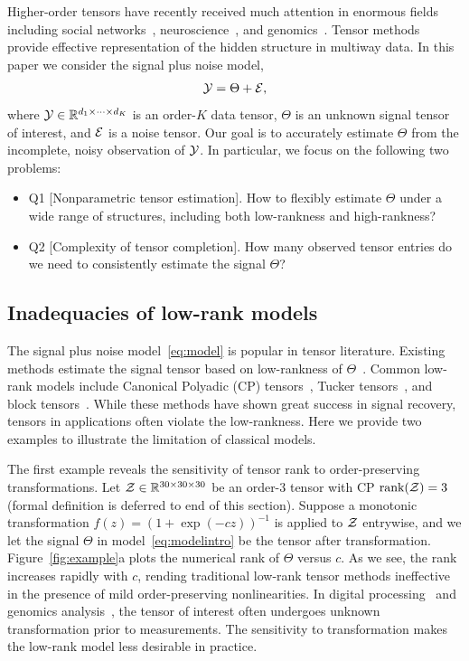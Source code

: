 \documentclass[useAMS,usenatbib,usegraphicx,referee]{biom}
\theoremstyle{plain}
\theoremstyle{definition}
\begin{document}
Higher-order tensors have recently received much attention in enormous fields including social networks~\citep{anandkumar2014tensor}, neuroscience~\citep{wang2017bayesian}, and genomics~\citep{hore2016tensor}. Tensor methods provide effective representation of the hidden structure in multiway data. In this paper we consider the signal plus noise model,
\begin{equation}\label{eq:modelintro}
\tY=\Theta+\tE,
\end{equation}
where $\mathcal{Y}\in\mathbb{R}^{d_1\times \cdots \times d_K}$ is an order-$K$ data tensor, $\Theta$ is an unknown signal tensor of interest, and $\mathcal{E}$ is a noise tensor. Our goal is to accurately estimate $\Theta$ from the incomplete, noisy observation of $\mathcal{Y}$. In particular, we focus on the following two problems:
\begin{itemize}[leftmargin=*]
\item Q1 [Nonparametric tensor estimation]. How to flexibly estimate $\Theta$ under a wide range of structures, including both low-rankness and high-rankness?
\item Q2 [Complexity of tensor completion]. How many observed tensor entries do we need to consistently estimate the signal $\Theta$?
\end{itemize}

\vspace{-.3cm}
\subsection{Inadequacies of  low-rank models} The signal plus noise model~\eqref{eq:model} is popular in tensor literature. Existing methods estimate the signal tensor based on low-rankness of $\Theta$~\citep{jain2014provable,montanari2018spectral}. Common low-rank models include Canonical Polyadic (CP) tensors~\citep{hitchcock1927expression}, Tucker tensors~\citep{de2000multilinear}, and block tensors~\citep{wang2019multiway}. While these methods have shown great success in signal recovery, tensors in applications often violate the low-rankness. Here we provide two examples to illustrate the limitation of classical models.


The first example reveals the sensitivity of tensor rank to order-preserving transformations. Let $\mathcal{Z} \in \mathbb{R}^{30\times 30\times 30}$ be an order-3 tensor with CP $\text{rank}(\mathcal{Z})=3$ (formal definition is deferred to end of this section). Suppose a monotonic transformation $f(z)=(1+\exp(-cz))^{-1}$ is applied to $\mathcal{Z}$ entrywise, and we let the signal $\Theta$ in model~\eqref{eq:modelintro} be the tensor after transformation. Figure~\ref{fig:example}a plots the numerical rank of $\Theta$ versus $c$. As we see, the rank increases rapidly with $c$, rending traditional low-rank tensor methods ineffective in the presence of mild order-preserving nonlinearities. In  digital processing~\citep{ghadermarzy2018learning} and genomics analysis~\citep{hore2016tensor}, the tensor of interest often undergoes unknown transformation prior to measurements. The sensitivity to transformation makes the low-rank model less desirable in practice. 
\end{document}
